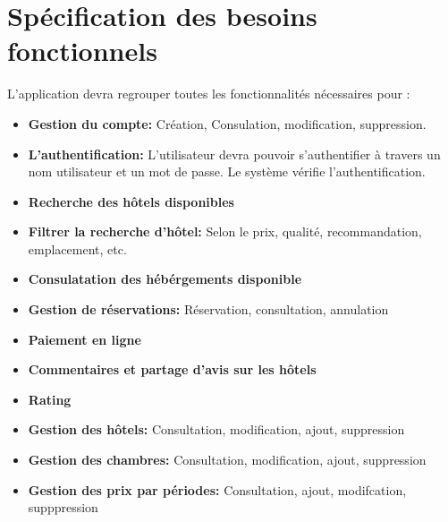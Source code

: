 \documentclass[12pt,a4paper]{report}
\begin{document}
		

		\section{Spécification des besoins fonctionnels}
L’application devra regrouper toutes les fonctionnalités nécessaires pour :\\
				\begin{itemize}
					\item \textbf{Gestion du compte:} Création, Consulation, modification, suppression.
					\item \textbf{L'authentification:} L’utilisateur devra pouvoir s’authentifier à travers un nom utilisateur et un mot de passe. Le système vérifie l’authentification.
					\item \textbf{Recherche des hôtels disponibles}
					\item \textbf{Filtrer la recherche d'hôtel:} Selon le prix, qualité, recommandation, emplacement, etc.
					\item \textbf{Consulatation des hébérgements disponible}
					\item \textbf{Gestion de réservations: } Réservation, consultation, annulation
					\item \textbf{Paiement en ligne}
					\item \textbf{Commentaires et partage d'avis sur les hôtels}
					\item \textbf{Rating}
					\item \textbf{Gestion des hôtels: } Consultation, modification, ajout, suppression
					\item \textbf{Gestion des chambres: } Consultation, modification, ajout, suppression
					\item \textbf{Gestion des prix par périodes: } Consultation, ajout, modifcation, supppression
				\end{itemize}
\end{document}
